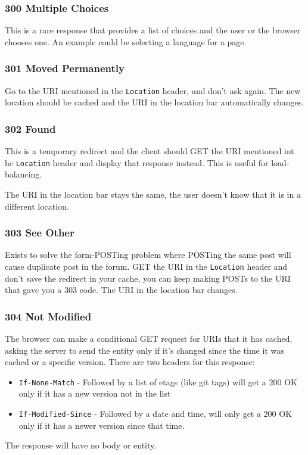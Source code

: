 \documentclass[../CMPUT-404-Notes.tex]{subfiles}
\begin{document}
\subsubsection{300 Multiple Choices}
This is a rare response that provides a list of choices and the user or the browser chooses one. An example could be selecting a language for a page.

\subsubsection{301 Moved Permanently}
Go to the URI mentioned in the \texttt{Location} header, and don't ask again. The new location should be cached and the URI in the location bar automatically changes.

\subsubsection{302 Found}
This is a temporary redirect and the client should GET the URI mentioned int he \texttt{Location} header and display that response instead. 
This is useful for load-balancing.
\begin{Note}
  The URI in the location bar stays the same, the user doesn't know that it is in a different location.
\end{Note}

\subsubsection{303 See Other}
Exists to solve the form-POSTing problem where POSTing the same post will cause duplicate post in the forum. 
GET the URI in the \texttt{Location} header and don't save the redirect in your cache, you can keep making POSTs to the URI that gave you a 303 code. The URI in the location bar changes.

\subsubsection{304 Not Modified}
The browser can make a conditional GET request for URIs that it has cached, asking the server to send the entity only if it's changed since the time it was cached or a specific version.
There are two headers for this response:
\begin{itemize}
  \item \texttt{If-None-Match} - Followed by a list of etags (like git tags) will get a 200 OK only if it has a new version not in the list
  \item \texttt{If-Modified-Since} - Followed by a date and time, will only get a 200 OK only if it has a newer version since that time.
\end{itemize}
The response will have no body or entity.
\end{document}

